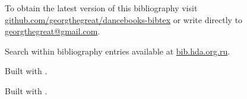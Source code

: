 \documentclass[10pt,a4paper]{article}
\begin{document}
To obtain the latest version of this bibliography visit \href{https://github.com/georgthegreat/dancebooks-bibtex}{github.com/georgthegreat/dancebooks-bibtex} or write directly to \href{mailto://georgthegreat@gmail.com}{georgthegreat@gmail.com}.

Search within bibliography entries available at \href{http://bib.hda.org.ru/bib}{bib.hda.org.ru}.

\ifluatex

Built with .

\else\ifpdf

Built with .

\fi\fi

\nocite{*}
\printbibliography
\end{document}
